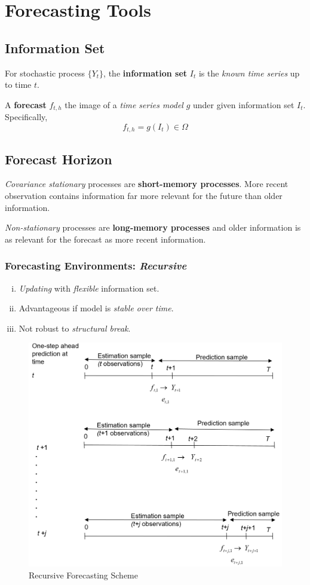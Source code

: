\documentclass[11pt]{article}
\begin{document}
	\section{Forecasting Tools}
	\subsection{Information Set}
		\begin{definition}
			For stochastic process $\{Y_t\}$, the \textbf{information set} $I_t$ is the \emph{known time series} up to time $t$.
		\end{definition}
		
		\begin{definition}
			A \textbf{forecast} $f_{t,h}$ the image of a \emph{time series model} $g$ under given information set $I_t$. Specifically,
			\begin{equation}
				f_{t,h} = g(I_t) \in \Omega
			\end{equation}
		\end{definition}
	\subsection{Forecast Horizon}
		\begin{remark}
			\emph{Covariance stationary} processes are \textbf{short-memory processes}. More recent observation contains information far more relevant for the future than older information.
		\end{remark}
		
		\begin{remark}
			\emph{Non-stationary} processes are \textbf{long-memory processes} and older information is as relevant for the forecast as more recent information.
		\end{remark}
		\subsubsection{Forecasting Environments: \emph{Recursive}}
			\begin{enumerate}[(i)]
				\item \emph{Updating} with \emph{flexible} information set.
				\item Advantageous if model is \emph{stable over time}.
				\item Not robust to \emph{structural break}. 
			\end{enumerate}
			\begin{figure}[H]
				\centering
				\includegraphics[width=0.5\linewidth]{figures/recursive_forecast}
				\caption{Recursive Forecasting Scheme}
			\end{figure}
\end{document}
